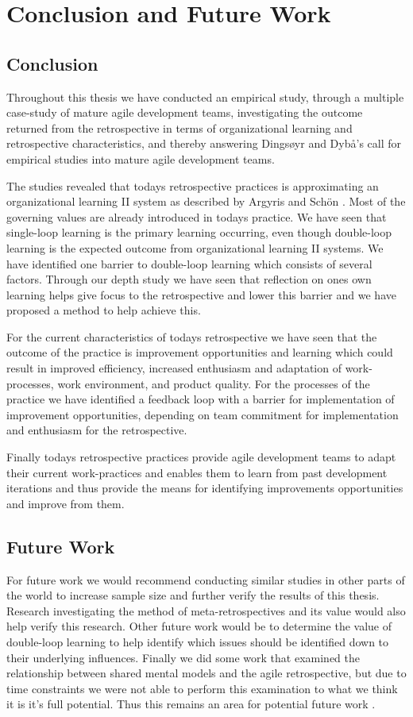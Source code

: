 \chapter{Conclusion and Future Work}
\section{Conclusion}
Throughout this thesis we have conducted an empirical study, through a multiple case-study of mature agile development teams, investigating the outcome returned from the retrospective in terms of organizational learning and retrospective characteristics, and thereby answering Dingsøyr and Dybå’s call \cite{Dyba2008} for empirical studies into mature agile development teams.

The studies revealed that todays retrospective practices is approximating an organizational learning II system as described by Argyris and Schön \cite{Argyris1996}. Most of the governing values are already introduced in todays practice. We have seen that single-loop learning is the primary learning occurring, even though double-loop learning is the expected outcome from organizational learning II systems. We have identified one barrier to double-loop learning which consists of several factors. Through our depth study we have seen that reflection on ones own learning helps give focus to the retrospective and lower this barrier and we have proposed a method to help achieve this. 

For the current characteristics of todays retrospective we have seen that the outcome of the practice is improvement opportunities and learning which could result in improved efficiency, increased enthusiasm and adaptation of work-processes, work environment, and product quality. For the processes of the practice we have identified a feedback loop with a barrier for implementation of improvement opportunities, depending on team commitment for implementation and enthusiasm for the retrospective. 

Finally todays retrospective practices provide agile development teams to adapt their current work-practices and enables them to learn from past development iterations and thus provide the means for identifying improvements opportunities and improve from them. 

\section{Future Work}
For future work we would recommend conducting similar studies in other parts of the world to increase sample size and further verify the results of this thesis. Research investigating the method of meta-retrospectives and its value would also help verify this research. Other future work would be to determine the value of double-loop learning to help identify which issues should be identified down to their underlying influences. Finally we did some work that examined the relationship between shared mental models and the agile retrospective, but due to time constraints we were not able to perform this examination to what we think it is it's full potential. Thus this remains an area for potential future work .

